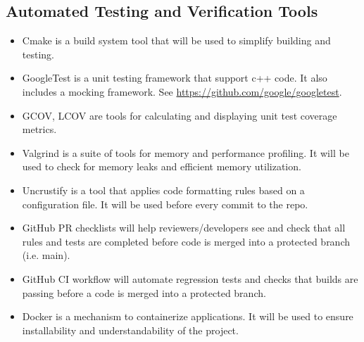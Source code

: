 \documentclass[12pt, titlepage]{article}
\begin{document}
\subsection{Automated Testing and Verification Tools}

\begin{itemize}
    \item Cmake \citep{cmake} is a build system tool that will be used to simplify building and
    testing.
    \item GoogleTest is a unit testing framework that support c++ code. It also includes a mocking
    framework. See \url{https://github.com/google/googletest}.
    \item GCOV, LCOV are tools for calculating and displaying unit test coverage metrics.
    \item Valgrind is a suite of tools for memory and performance profiling. It will be used to
    check for memory leaks and efficient memory utilization.
    \item Uncrustify is a tool that applies code formatting rules based on a configuration file. It
    will be used before every commit to the repo.
    \item GitHub PR checklists will help reviewers/developers see and check that all rules and tests
    are completed before code is merged into a protected branch (i.e. main).
    \item GitHub CI workflow will automate regression tests and checks that \progname{} builds are
    passing before a code is merged into a protected branch.
    \item Docker is a mechanism to containerize applications. It will be used to ensure
    installability and understandability of the project.
\end{itemize}



\end{document}
